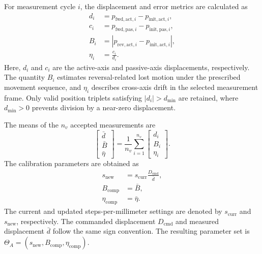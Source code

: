 \documentclass[journal]{IEEEtran}
\begin{document}
For measurement cycle $i$, the displacement and
error metrics are calculated as
\begin{equation}
\label{eq:kinematic_error_metrics}
\begin{aligned}
d_i &=
p_{\mathrm{fwd,act},i}-p_{\mathrm{init,act},i},\\
c_i &=
p_{\mathrm{fwd,pas},i}-p_{\mathrm{init,pas},i},\\
B_i &=
\left|p_{\mathrm{rev,act},i}
-p_{\mathrm{init,act},i}\right|,\\
\eta_i &= \frac{c_i}{d_i}.
\end{aligned}
\end{equation}
Here, $d_i$ and $c_i$ are the active-axis and
passive-axis displacements, respectively.
The quantity $B_i$ estimates reversal-related
lost motion under the prescribed movement sequence,
and $\eta_i$ describes cross-axis drift in the
selected measurement frame.
Only valid position triplets satisfying
$|d_i|>d_{\mathrm{min}}$ are retained, where
$d_{\mathrm{min}}>0$ prevents division by
a near-zero displacement.

The means of the $n_v$ accepted measurements are
\begin{equation}
\label{eq:kinematic_parameter_means}
\begin{bmatrix}
\bar d\\
\bar B\\
\bar\eta
\end{bmatrix}
=
\frac{1}{n_v}
\sum_{i=1}^{n_v}
\begin{bmatrix}
d_i\\
B_i\\
\eta_i
\end{bmatrix}.
\end{equation}
The calibration parameters are obtained as
\begin{equation}
\label{eq:calibration_parameter_update}
\begin{aligned}
s_{\mathrm{new}}
&=
s_{\mathrm{curr}}
\frac{D_{\mathrm{cmd}}}{\bar d},\\
B_{\mathrm{comp}}&=\bar B,\\
\eta_{\mathrm{comp}}&=\bar\eta.
\end{aligned}
\end{equation}
The current and updated steps-per-millimeter settings
are denoted by $s_{\mathrm{curr}}$ and
$s_{\mathrm{new}}$, respectively.
The commanded displacement $D_{\mathrm{cmd}}$
and measured displacement $\bar d$ follow the
same sign convention.
The resulting parameter set is
$\Theta_A=(s_{\mathrm{new}},B_{\mathrm{comp}},
\eta_{\mathrm{comp}})$.
\end{document}
